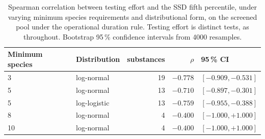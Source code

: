 \begin{table}[htbp]\centering\scriptsize\setlength{\tabcolsep}{2.4pt}
\caption{Spearman correlation between testing effort and the SSD fifth percentile, under varying minimum species requirements and distributional form, on the screened pool under the operational duration rule. Testing effort is distinct tests, as throughout. Bootstrap 95\,\% confidence intervals from 4000 resamples.}
\label{tab:sens}
\begin{tabular}{@{}l l r r l@{}}\toprule
Minimum species & Distribution & substances & $\rho$ & 95\,\% CI \\\midrule
3 & log-normal & 19 & $-0.778$ & $[-0.909, -0.531]$ \\
5 & log-normal & 13 & $-0.710$ & $[-0.897, -0.301]$ \\
5 & log-logistic & 13 & $-0.759$ & $[-0.955, -0.388]$ \\
8 & log-normal & 4 & $-0.400$ & $[-1.000, +1.000]$ \\
10 & log-normal & 4 & $-0.400$ & $[-1.000, +1.000]$ \\
\bottomrule\end{tabular}\end{table}
